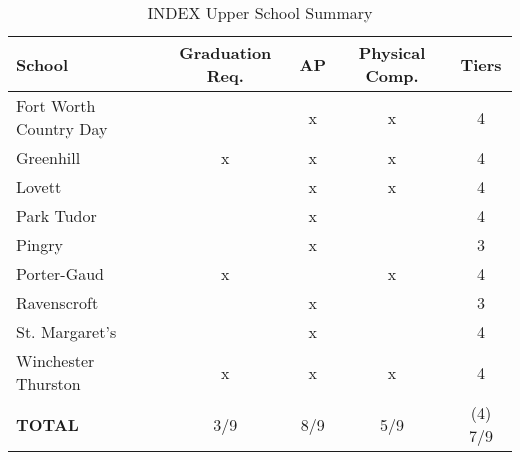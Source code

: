 \begin{table}[]
\centering
\caption{INDEX Upper School Summary}
\label{indexCS}
\begin{tabular}{|l|c|c|c|c|} \hline
\textbf{School}     & \textbf{Graduation Req.} & \textbf{AP} & \textbf{Physical Comp.} & \textbf{Tiers} \\ \hline
Fort Worth Country Day &                 & x  & x                  & 4     \\
Greenhill              & x               & x  & x                  & 4     \\
Lovett                 &                 & x  & x                  & 4     \\
Park Tudor             &                 & x  &                    & 4     \\
Pingry                 &                 & x  &                    & 3     \\
Porter-Gaud            & x               &    & x                  & 4     \\
Ravenscroft            &                 & x  &                    & 3     \\
St. Margaret's         &                 & x  &                    & 4     \\ 
Winchester Thurston    & x               & x  & x                  & 4     \\\hline
\textbf{TOTAL}		   & 3/9             & 8/9  & 5/9              & (4) 7/9 \\\hline
\end{tabular}
\end{table}
